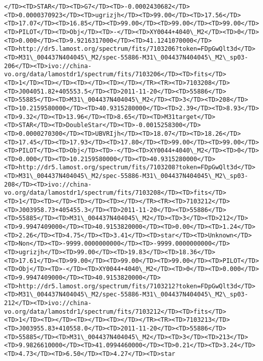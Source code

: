 \documentclass[11pt]{article}
\begin{document}
\begin{Verbatim}[commandchars=\\\{\}]
</TD><TD>STAR</TD><TD>G7</TD><TD>-0.0002430682</TD><TD>0.0000370923</TD><TD>ugrizjh</TD><TD>99.00</TD><TD>17.56</TD><TD>17.07</TD><TD>16.85</TD><TD>99.00</TD><TD>99.00</TD><TD>99.00</TD><TD>PILOT</TD><TD>Obj</TD><TD>-</TD><TD>XY0044+4040\_M2</TD><TD>0</TD><TD>0.000</TD><TD>9.9216317000</TD><TD>41.1241070000</TD><TD>http://dr5.lamost.org/spectrum/fits/7103206?token=FDpGwQlt3d</TD><TD>M31\_004437N404045\_M2/spec-55886-M31\_004437N404045\_M2\_sp03-206</TD><TD>ivo://china-vo.org/data/lamostdr1/spectrum/fits/7103206</TD><TD>fits</TD><TD>1</TD><TD></TD><TD></TD><TD></TD></TR><TR><TD>7103208</TD><TD>J004051.82+405553.5</TD><TD>2011-11-20</TD><TD>55886</TD><TD>55885</TD><TD>M31\_004437N404045\_M2</TD><TD>3</TD><TD>208</TD><TD>10.2159580000</TD><TD>40.9315280000</TD><TD>2.39</TD><TD>8.93</TD><TD>9.32</TD><TD>13.96</TD><TD>8.65</TD><TD>M31target</TD><TD>STAR</TD><TD>DoubleStar</TD><TD>-0.0015258300</TD><TD>0.0000270300</TD><TD>UBVRIjh</TD><TD>18.07</TD><TD>18.26</TD><TD>17.45</TD><TD>17.93</TD><TD>17.80</TD><TD>99.00</TD><TD>99.00</TD><TD>PILOT</TD><TD>Obj</TD><TD>-</TD><TD>XY0044+4040\_M2</TD><TD>0</TD><TD>0.000</TD><TD>10.2159580000</TD><TD>40.9315280000</TD><TD>http://dr5.lamost.org/spectrum/fits/7103208?token=FDpGwQlt3d</TD><TD>M31\_004437N404045\_M2/spec-55886-M31\_004437N404045\_M2\_sp03-208</TD><TD>ivo://china-vo.org/data/lamostdr1/spectrum/fits/7103208</TD><TD>fits</TD><TD>1</TD><TD></TD><TD></TD><TD></TD></TR><TR><TD>7103212</TD><TD>J003958.73+405455.3</TD><TD>2011-11-20</TD><TD>55886</TD><TD>55885</TD><TD>M31\_004437N404045\_M2</TD><TD>3</TD><TD>212</TD><TD>9.9947409000</TD><TD>40.9153820000</TD><TD>0.00</TD><TD>1.24</TD><TD>2.26</TD><TD>4.75</TD><TD>3.41</TD><TD>star</TD><TD>Unknown</TD><TD>Non</TD><TD>-9999.0000000000</TD><TD>-9999.0000000000</TD><TD>ugrizjh</TD><TD>99.00</TD><TD>19.83</TD><TD>18.36</TD><TD>17.61</TD><TD>99.00</TD><TD>99.00</TD><TD>99.00</TD><TD>PILOT</TD><TD>Obj</TD><TD>-</TD><TD>XY0044+4040\_M2</TD><TD>0</TD><TD>0.000</TD><TD>9.9947409000</TD><TD>40.9153820000</TD><TD>http://dr5.lamost.org/spectrum/fits/7103212?token=FDpGwQlt3d</TD><TD>M31\_004437N404045\_M2/spec-55886-M31\_004437N404045\_M2\_sp03-212</TD><TD>ivo://china-vo.org/data/lamostdr1/spectrum/fits/7103212</TD><TD>fits</TD><TD>1</TD><TD></TD><TD></TD><TD></TD></TR><TR><TD>7103213</TD><TD>J003955.83+410558.0</TD><TD>2011-11-20</TD><TD>55886</TD><TD>55885</TD><TD>M31\_004437N404045\_M2</TD><TD>3</TD><TD>213</TD><TD>9.9826610000</TD><TD>41.0994460000</TD><TD>0.21</TD><TD>3.24</TD><TD>4.73</TD><TD>6.50</TD><TD>4.27</TD><TD>star     
\end{Verbatim}
\end{document}
